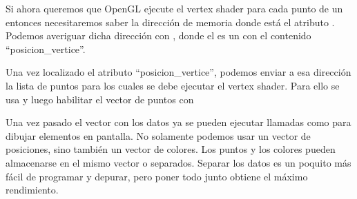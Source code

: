 \documentclass[a4paper,12pt,spanish]{sphinxmanual}
\begin{document}
Si ahora queremos que OpenGL ejecute el vertex shader para cada punto de un  entonces necesitaremos saber la dirección de memoria donde está el atributo . Podemos averiguar dicha dirección con , donde el  es un  con el contenido ``posicion\_vertice''.

Una vez localizado el atributo ``posicion\_vertice'', podemos enviar a esa dirección la lista de puntos para los cuales se debe ejecutar el vertex shader. Para ello se usa  y luego habilitar el vector de puntos con 

Una vez pasado el vector con los datos ya se pueden ejecutar llamadas como  para dibujar elementos en pantalla. No solamente podemos usar un vector de posiciones, sino también un vector de colores. Los puntos y los colores pueden almacenarse en el mismo vector o separados. Separar los datos es un poquito más fácil de programar y depurar, pero poner todo junto obtiene el máximo rendimiento.



\renewcommand{\indexname}{Índice}
\printindex
\end{document}
